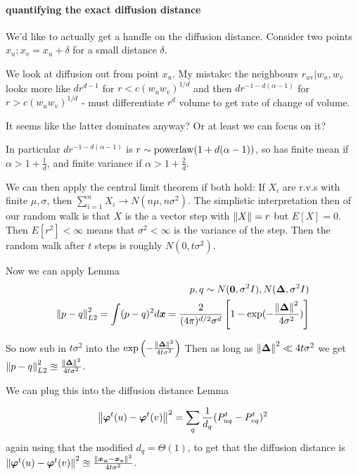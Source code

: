 \paragraph{quantifying the exact diffusion distance} We'd like to actually get a handle on the diffusion distance. Consider two points $x_u; x_v = x_u + \delta$ for a small distance $\delta$.

We look at diffusion out from point $x_u$.
My mistake: the neighbours $r_{uv} | w_u, w_v$ looks more like $d r^{d-1}$ for $r < c (w_u w_v)^{1/d}$ and then $d r^{-1 -d(\alpha-1)}$ for $r > c(w_u w_v)^{1/d}$ - must differentiate $r^d$ volume to get rate of change of volume.

It seems like the latter dominates anyway? Or at least we can focus on it?

In particular $d r^{-1 -d(\alpha -1)}$ is $r \sim \operatorname{powerlaw}(1 + d(\alpha-1))$, so has finite mean if $\alpha > 1 + \frac{1}{d}$, and finite variance if $\alpha > 1 + \frac{2}{d}$.

We can then apply the central limit theorem if both hold: If $X_i$ are r.v.s with finite $\mu, \sigma$, then $\sum_{i=1}^n X_i \to N(n \mu, n \sigma^2)$. The simplistic interpretation then of our random walk is that $X$ is the a vector step with $\left\lVert X\right\rVert = r$ but $E[X] = 0$. Then $E[r^2] < \infty$ means that $\sigma^2 < \infty$ is the variance of the step. Then the random walk after $t$ steps is roughly $N(0, t \sigma^2)$.

Now we can apply Lemma
\begin{align}
p, q \sim N(\bm{0}, \sigma^2 I), N(\bm{\Delta}, \sigma^2 I)\\
\left\lVert p - q\right\rVert^2_{L2} = \int (p-q)^2 d\bm{x} = \frac{2}{(4 \pi )^{d/2} \sigma^d} \left [ 1 - \exp(-\frac{\left\lVert \bm{\Delta}\right\rVert^2}{4 \sigma^2}) \right ]
\end{align}

So now sub in $t \sigma^2$ into the $\exp \left ( 
  -\frac{\left\lVert \bm{\Delta}\right\rVert^2}{4 t \sigma^2}
\right )
$
Then as long as $\left\lVert \bm{\Delta}\right\rVert^2 \ll 4 t \sigma^2$ we get $\left\lVert p - q\right\rVert^2_{L2} \approxeq \frac{\left\lVert \bm{\Delta}\right\rVert^2}{4 t \sigma^2}$.

We can plug this into the diffusion distance Lemma

\begin{align}
\left\lVert \bm{\varphi}^t(u) - \bm{\varphi}^t(v)\right\rVert^2 = \sum_{q} \frac{1}{d_q} (P^t_{uq} - P^t_{vq})^2
\end{align}
again using that the modified $d_q = \Theta(1)$, to get that the diffusion distance is $\left\lVert \bm{\varphi}^t(u) - \bm{\varphi}^t(v)\right\rVert^2 \approxeq \frac{\left\lVert \bm{x_u} - \bm{x_v}\right\rVert^2}{4 t \sigma^2}$.

